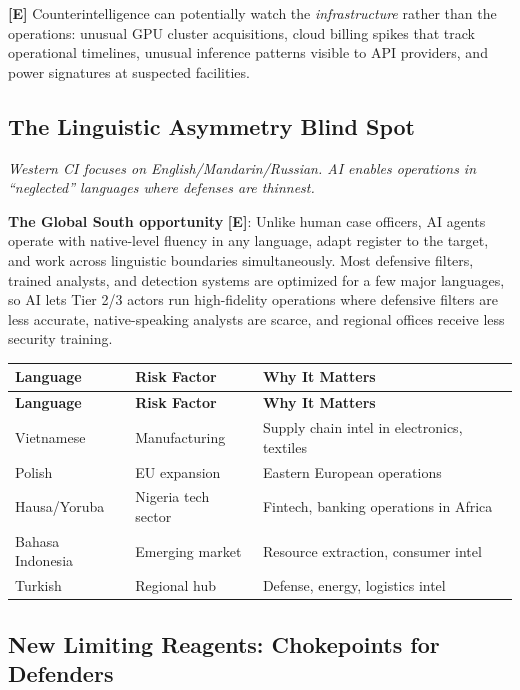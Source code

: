 \documentclass[11pt,letterpaper]{article}
\newcommand{\etraneed}[1]{\par\ifdim\pagegoal<\maxdimen\ifdim\pagetotal<\pagegoal\ifdim\dimexpr\pagegoal-\pagetotal\relax<\dimexpr#1\relax\newpage\fi\fi\fi}
\begin{document}
\begin{infobox}
\textbf{[E]} Counterintelligence can potentially watch the \textit{infrastructure} rather than the operations: unusual GPU cluster acquisitions, cloud billing spikes that track operational timelines, unusual inference patterns visible to API providers, and power signatures at suspected facilities.
\end{infobox}

\subsection{The Linguistic Asymmetry Blind Spot}

\textit{Western CI focuses on English/Mandarin/Russian. AI enables operations in ``neglected'' languages where defenses are thinnest.}

\textbf{The Global South opportunity} \textbf{[E]}: Unlike human case officers, AI agents operate with native-level fluency in any language, adapt register to the target, and work across linguistic boundaries simultaneously. Most defensive filters, trained analysts, and detection systems are optimized for a few major languages, so AI lets Tier 2/3 actors run high-fidelity operations where defensive filters are less accurate, native-speaking analysts are scarce, and regional offices receive less security training.

\etraneed{11\baselineskip}
{\small
\begin{longtable}{L{3cm}L{3.5cm}L{5.5cm}}
\toprule
\textbf{Language} & \textbf{Risk Factor} & \textbf{Why It Matters} \\
\midrule
\endfirsthead
\toprule
\textbf{Language} & \textbf{Risk Factor} & \textbf{Why It Matters} \\
\midrule
\endhead
Vietnamese & Manufacturing & Supply chain intel in electronics, textiles \\*
Polish & EU expansion & Eastern European operations \\
Hausa/Yoruba & Nigeria tech sector & Fintech, banking operations in Africa \\
Bahasa Indonesia & Emerging market & Resource extraction, consumer intel \\*
Turkish & Regional hub & Defense, energy, logistics intel \\
\bottomrule
\end{longtable}}

\subsection{New Limiting Reagents: Chokepoints for Defenders}
\end{document}
